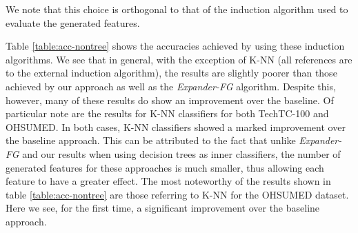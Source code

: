 \documentclass[twoside,11pt]{article}
\theoremstyle{definition}
\begin{document}
We note that this choice is orthogonal to that of the induction algorithm used to evaluate the generated features.

Table \ref{table:acc-nontree} shows the accuracies achieved by using these induction algorithms. We see that in general, with the exception of K-NN (all references are to the external induction algorithm), the results are slightly poorer than those achieved by our approach as well as the \emph{Expander-FG} algorithm. Despite this, however,  many of these results do show an improvement over the baseline.
Of particular note are the results for K-NN classifiers for both TechTC-100 and OHSUMED. In both cases, K-NN classifiers showed a marked improvement over the baseline approach. This can be attributed to the fact that unlike \emph{Expander-FG} and our results when using decision trees as inner classifiers, the number of generated features for these approaches is much smaller, thus allowing each feature to have a greater effect.
The most noteworthy of the results shown in table \ref{table:acc-nontree} are those referring to K-NN for the OHSUMED dataset. Here we see, for the first time, a significant improvement over the baseline approach.
\end{document}
